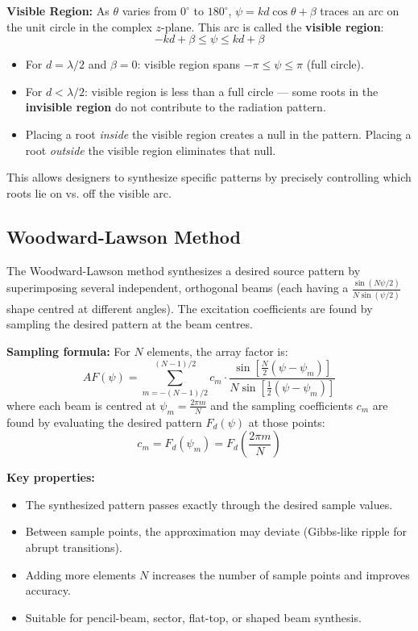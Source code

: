 \documentclass[12pt,a4paper]{article}
\begin{document}
\textbf{Visible Region:} As $\theta$ varies from $0^\circ$ to $180^\circ$, $\psi = kd\cos\theta + \beta$ traces an arc on the unit circle in the complex $z$-plane. This arc is called the \textbf{visible region}:
\[
-kd + \beta \le \psi \le kd + \beta
\]
\begin{itemize}[leftmargin=*, itemsep=3pt]
  \item For $d = \lambda/2$ and $\beta = 0$: visible region spans $-\pi \le \psi \le \pi$ (full circle).
  \item For $d < \lambda/2$: visible region is less than a full circle — some roots in the \textbf{invisible region} do not contribute to the radiation pattern.
  \item Placing a root \textit{inside} the visible region creates a null in the pattern. Placing a root \textit{outside} the visible region eliminates that null.
\end{itemize}
This allows designers to synthesize specific patterns by precisely controlling which roots lie on vs. off the visible arc.

\subsection{Woodward-Lawson Method}
The Woodward-Lawson method synthesizes a desired source pattern by superimposing several independent, orthogonal beams (each having a $\frac{\sin(N\psi/2)}{N\sin(\psi/2)}$ shape centred at different angles). The excitation coefficients are found by sampling the desired pattern at the beam centres.

\textbf{Sampling formula:} For $N$ elements, the array factor is:
\[
AF(\psi) = \sum_{m=-(N-1)/2}^{(N-1)/2} c_m \cdot \frac{\sin\!\left[\frac{N}{2}(\psi - \psi_m)\right]}{N\sin\!\left[\frac{1}{2}(\psi - \psi_m)\right]}
\]
where each beam is centred at $\psi_m = \frac{2\pi m}{N}$ and the sampling coefficients $c_m$ are found by evaluating the desired pattern $F_d(\psi)$ at those points:
\[
c_m = F_d(\psi_m) = F_d\!\left(\frac{2\pi m}{N}\right)
\]

\textbf{Key properties:}
\begin{itemize}[leftmargin=*, itemsep=2pt]
  \item The synthesized pattern passes exactly through the desired sample values.
  \item Between sample points, the approximation may deviate (Gibbs-like ripple for abrupt transitions).
  \item Adding more elements $N$ increases the number of sample points and improves accuracy.
  \item Suitable for pencil-beam, sector, flat-top, or shaped beam synthesis.
\end{itemize}
\end{document}
